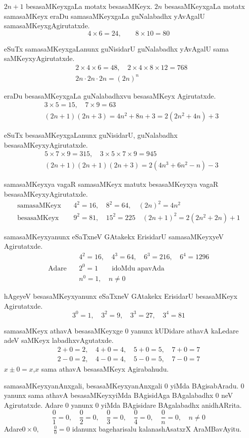 $2n+1$ besasaMKeyxgaLa motatx besasaMKeyx. $2n$ besasaMKeyxgaLa motatx samasaMKeyx eraDu samasaMKeyxgaLa guNalabadhx yAvAgalU samasaMKeyxgAgirutatxde.
$$
4\times6=24, \qquad 8\times10 =80
$$

eSuTx samasaMKeyxgaLanunx guNisidarU guNalabadhx yAvAgalU sama saMKeyxyAgirutatxde.
\begin{align*}
&2\times 4\times 6 = 48, \quad 2\times 4 \times 8 \times 12 =768\\
& 2n\cdot 2n\cdot 2n = (2n)^n 
\end{align*}

eraDu besasaMKeyxgaLa guNalabadhxvu besasaMKeyx Agirutatxde.
\begin{align*}
& 3\times 5=15, \quad 7\times 9=63\\
& (2n+1)(2n+3) = 4n^{2}+8n+3=2(2n^{2}+4n)+3
\end{align*}

eSuTx besasaMKeyxgaLanunx guNisidarU, guNalabadhx besasaMKeyxyAgirutatxde.
\begin{align*}
&5\times 7\times 9 =315, \quad 3\times 5\times 7 \times 9 = 945\\
&(2n+1)(2n+1)(2n+3) = 2(4n^{3} + 6n^{2}-n)-3
\end{align*}

samasaMKeyxya vagaR samasaMKeyx matutx besasaMKeyxya vagaR besasaMKeyxyAgirutatxde.
\begin{align*}
\text{samasaMKeyx}&\quad 4^{2} =16, \quad 8^{2}=64, \quad (2n)^{2} = 4n^{2}\\
\text{besasaMKeyx}&\quad 9^{2} =81, \quad 15^{2}=225 \quad (2n+1)^{2}=2(2n^{2}+2n)+1
\end{align*}

samasaMKeyxyanunx eSaTxneV GAtakekx ErisidarU samasaMKeyxyeV Agirutatxde.
\begin{align*}
&\quad 4^{2}=16, \quad 4^{3}=64, \quad 6^{3}=216, \quad 6^{4}=1296\\
\text{Adare} &\quad 2^{0} = 1 \qquad \text{idoMdu apavAda}\\
&\quad n^{0}=1,\quad n\neq 0 
\end{align*}

hAgeyeV besasaMKeyxyanunx eSaTxneV GAtakekx ErisidarU besasaMKeyx Agirutatxde.
$$
3^{0}=1, \quad 3^{2}=9, \quad 3^{3}=27, \quad 3^{4}=81
$$

samasaMKeyx athavA besasaMKeyxge $0$ yanunx kUDidare athavA kaLedare adeV saMKeyx labadhxvAgutatxde.
\begin{align*}
2+0 =2, \quad 4+0=4, \quad 5+0=5, \quad 7+0=7\\
2-0 =2, \quad 4-0=4, \quad 5-0=5, \quad 7-0=7
\end{align*}
$x\pm 0 =x$,\quad $x$ sama athavA besasaMKeyx Agirabahudu. 

samasaMKeyxyanAnxgali, besasaMKeyxyanAnxgali $0$ yiMda BAgisabAradu. $0$ yanunx sama athavA besasaMKeyxyiMda BAgisidAga BAgalabadhx $0$ neV Agirutatxde. Adare $0$ yanunx $0$ yiMda BAgisidare BAgalabadhx anidhARrita.
$$
\frac{0}{1} = 0, \quad \frac{0}{2}=0,\quad \frac{0}{3}=0, \quad \frac{0}{4}=0, \quad \frac{0}{n} = 0, \quad n\neq 0
$$
Adare\quad $0\times 0,\quad \quad \frac{0}{0}=0$ idanunx bageharisalu kalanashAsatxrX AraMBavAyitu.  

